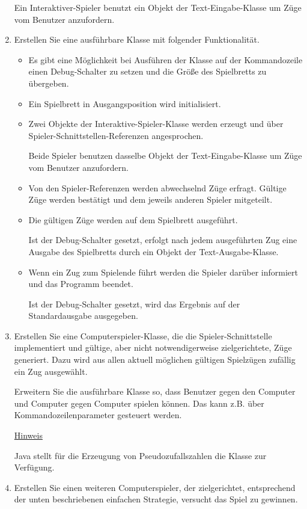 \begin{enumerate}
Ein Interaktiver-Spieler benutzt ein Objekt der Text-Eingabe-Klasse um Züge vom Benutzer anzufordern.
\item Erstellen Sie eine ausführbare Klasse mit folgender Funktionalität.
\begin{itemize}
\item Es gibt eine Möglichkeit bei Ausführen der Klasse auf der Kommandozeile einen Debug-Schalter zu setzen und die Größe des Spielbretts zu übergeben.
\item Ein Spielbrett in Ausgangsposition wird initialisiert.
\item Zwei Objekte der Interaktive-Spieler-Klasse werden erzeugt und über Spieler-Schnittstellen-Referenzen angesprochen. 

Beide Spieler benutzen dasselbe Objekt der Text-Eingabe-Klasse um Züge vom Benutzer anzufordern.
\item Von den Spieler-Referenzen werden abwechselnd Züge erfragt. Gültige Züge werden bestätigt und dem jeweils anderen Spieler mitgeteilt.
\item Die gültigen Züge werden auf dem Spielbrett ausgeführt.

Ist der Debug-Schalter gesetzt, erfolgt nach jedem ausgeführten Zug eine Ausgabe des Spielbretts durch ein Objekt der Text-Ausgabe-Klasse.
\item Wenn ein Zug zum Spielende führt werden die Spieler darüber informiert und das Programm beendet.

Ist der Debug-Schalter gesetzt, wird das Ergebnis auf der Standardausgabe ausgegeben.
\end{itemize}
\item Erstellen Sie eine Computerspieler-Klasse, die die Spieler-Schnittstelle implementiert und gültige, aber nicht notwendigerweise zielgerichtete, Züge generiert. Dazu wird aus allen aktuell möglichen gültigen Spielzügen zufällig ein Zug ausgewählt.

Erweitern Sie die ausführbare Klasse so, dass Benutzer gegen den Computer und Computer gegen Computer spielen können. Das kann z.B. über Kommandozeilenparameter gesteuert werden.

\underline{Hinweis}

Java stellt für die Erzeugung von Pseudozufallszahlen die Klasse  zur Verfügung.
\item Erstellen Sie einen weiteren Computerspieler, der zielgerichtet, entsprechend der unten beschriebenen einfachen Strategie, versucht das Spiel zu gewinnen.


\end{enumerate}
